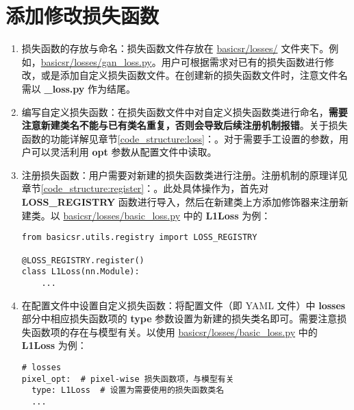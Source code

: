 \documentclass[../main.tex]{subfiles}
\begin{document}
\section{添加修改损失函数}\label{howto:add_loss}

\begin{enumerate}[第 1 步]
    \item 损失函数的存放与命名：损失函数文件存放在 \href{https://github.com/XPixelGroup/BasicSR/tree/master/basicsr/losses}{basicsr/losses/} 文件夹下。例如，\href{https://github.com/XPixelGroup/BasicSR/blob/master/basicsr/losses/gan_loss.py}{basicsr/losses/gan\_loss.py}。用户可根据需求对已有的损失函数进行修改，或是添加自定义损失函数文件。在创建新的损失函数文件时，注意文件名需以  \textbf{\_loss.py} 作为结尾。

    \item 编写自定义损失函数：在损失函数文件中对自定义损失函数类进行命名，\textbf{需要注意新建类名不能与已有类名重复，否则会导致后续注册机制报错}。关于损失函数的功能详解见章节\ref{code_structure:loss}：。对于需要手工设置的参数，用户可以灵活利用 \textbf{opt} 参数从配置文件中读取。

    \item 注册损失函数：用户需要对新建的损失函数类进行注册。注册机制的原理详见章节\ref{code_structure:register}：。此处具体操作为，首先对 \textbf{LOSS\_REGISTRY} 函数进行导入，然后在新建类上方添加修饰器来注册新建类。以 \href{https://github.com/XPixelGroup/BasicSR/blob/master/basicsr/losses/basic_loss.py}{basicsr/losses/basic\_loss.py} 中的 \textbf{L1Loss} 为例：
\begin{verbatim}
from basicsr.utils.registry import LOSS_REGISTRY

@LOSS_REGISTRY.register()
class L1Loss(nn.Module):
    ...
\end{verbatim}

    \item 在配置文件中设置自定义损失函数：将配置文件（即 YAML 文件）中 \textbf{losses} 部分中相应损失函数项的 \textbf{type} 参数设置为新建的损失类名即可。需要注意损失函数项的存在与模型有关。以使用 \href{https://github.com/XPixelGroup/BasicSR/tree/master/basicsr/losses/basic_loss.py}{basicsr/losses/basic\_loss.py} 中的 \textbf{L1Loss} 为例：
\begin{verbatim}
# losses
pixel_opt:  # pixel-wise 损失函数项，与模型有关
  type: L1Loss  # 设置为需要使用的损失函数类名
  ...
\end{verbatim}
\end{enumerate}
\end{document}
